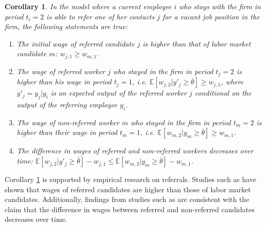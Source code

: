 \documentclass[12pt]{article}
\newtheorem{corollary}[theorem]{Corollary}
\begin{document}
\begin{corollary}\label{cor:wages_vr}
    In the model where a current employee $i$ who stays with the firm in period $t_i = 2$ is able to refer one of her contacts $j$ for a vacant job position in the firm, the following statements are true:
    \begin{enumerate}[label={\roman*})]
        \item The initial wage of referred candidate $j$ is higher than that of labor market candidate $m$:
        $w_{j,1} \geq w_{m,1}$.
        \item The wage of referred worker $j$ who stayed in the firm in period $t_j = 2$ is higher than his wage in period $t_j = 1$, i.e. $\mathbb{E}[w_{j,2}|y'_j \geq \bar{\theta}] \geq w_{j,1}$, where $y'_j = y_j | y_i$ is an expected output of the referred worker $j$ conditional on the output of the referring employee $y_i$.
        \item The wage of non-referred worker $m$ who stayed in the firm in period $t_m = 2$ is higher than their wage in period $t_m = 1$, i.e. $\mathbb{E}[w_{m,2}|y_m \geq \bar{\theta}] \geq w_{m,1}$.
        \item The difference in wages of referred and non-referred workers decreases over time: $\mathbb{E}[w_{j,2}|y'_j \geq \bar{\theta}] - w_{j,1} \leq \mathbb{E}[w_{m,2}|y_m \geq \bar{\theta}]- w_{m,1}$.
    \end{enumerate}
\end{corollary}

Corollary \ref{cor:wages_vr} is supported by empirical research on referrals. Studies such as \cite{corcoran1980most, korenman1996employment, loury2006some} have shown that wages of referred candidates are higher than those of labor market candidates. Additionally, findings from studies such as \cite{montgomery1991social, simon1992matchmaker, dustmann2016referral} are consistent with the claim that the difference in wages between referred and non-referred candidates decreases over time.
\end{document}
